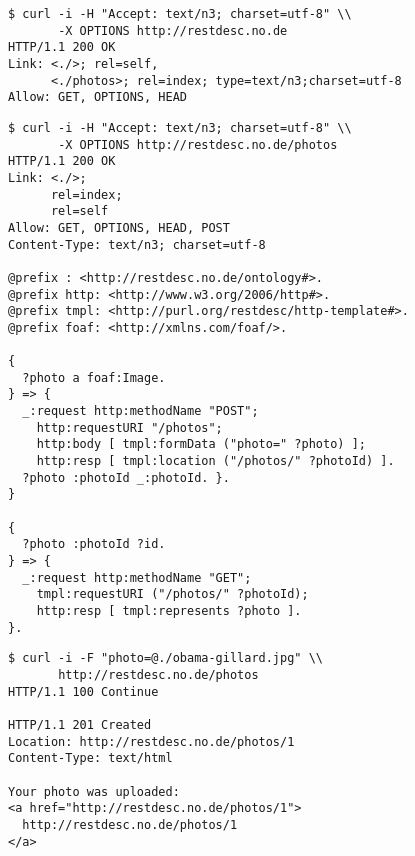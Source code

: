 \documentclass[smallextended]{svjour3}
\begin{document}
{\begin{figure}
\begin{lstlisting}[caption=An OPTIONS call on an API's base URI, label=lst:BaseOPTIONS, escapechar=§]
$ curl -i -H "Accept: text/n3; charset=utf-8" \\
       -X OPTIONS http://restdesc.no.de
HTTP/1.1 200 OK
Link: <./>; rel=self,
      <./photos>; rel=index; type=text/n3;charset=utf-8
Allow: GET, OPTIONS, HEAD
\end{lstlisting}
\end{figure}

\begin{figure}
\begin{lstlisting}[caption=An OPTIONS call on a discovered index path from an API's base URI while accepting text/n3 responses, label=lst:PhotosOPTIONS, escapechar=§]
$ curl -i -H "Accept: text/n3; charset=utf-8" \\
       -X OPTIONS http://restdesc.no.de/photos
HTTP/1.1 200 OK
Link: <./>;
      rel=index;
      rel=self
Allow: GET, OPTIONS, HEAD, POST
Content-Type: text/n3; charset=utf-8

@prefix : <http://restdesc.no.de/ontology#>.
@prefix http: <http://www.w3.org/2006/http#>.
@prefix tmpl: <http://purl.org/restdesc/http-template#>.
@prefix foaf: <http://xmlns.com/foaf/>.

{
  ?photo a foaf:Image.
} => {
  _:request http:methodName "POST";
    http:requestURI "/photos";
    http:body [ tmpl:formData ("photo=" ?photo) ];
    http:resp [ tmpl:location ("/photos/" ?photoId) ].
  ?photo :photoId _:photoId. }.
}

{
  ?photo :photoId ?id.
} => {
  _:request http:methodName "GET";
    tmpl:requestURI ("/photos/" ?photoId);
    http:resp [ tmpl:represents ?photo ].
}.
\end{lstlisting}
\end{figure}

\begin{figure}
\begin{lstlisting}[caption=A POST call in order to upload a photo discovered via the Notation3 data from the previous request, label=lst:PhotoPOST, escapechar=§]
$ curl -i -F "photo=@./obama-gillard.jpg" \\
       http://restdesc.no.de/photos
HTTP/1.1 100 Continue

HTTP/1.1 201 Created
Location: http://restdesc.no.de/photos/1
Content-Type: text/html

Your photo was uploaded:
<a href="http://restdesc.no.de/photos/1">
  http://restdesc.no.de/photos/1
</a>
\end{lstlisting}
\end{figure}

}
\end{document}
